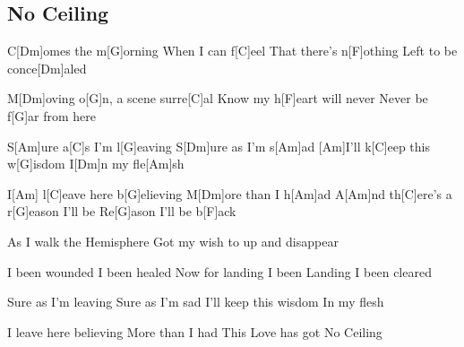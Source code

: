 \subsection*{No Ceiling}
\begin{guitar}
C[Dm]omes the m[G]orning
When I can f[C]eel
That there's n[F]othing
Left to be conce[Dm]aled

M[Dm]oving o[G]n,
a scene surre[C]al
Know my h[F]eart will never
Never be f[G]ar from here

S[Am]ure a[C]s I'm l[G]eaving
S[Dm]ure as I'm s[Am]ad
[Am]I'll k[C]eep this w[G]isdom
I[Dm]n my fle[Am]sh

I[Am]   l[C]eave here b[G]elieving
M[Dm]ore than I h[Am]ad
A[Am]nd th[C]ere's a r[G]eason I'll be
Re[G]ason I'll be b[F]ack


As I walk
the Hemisphere
Got my wish
to up and disappear

I been wounded
I been healed
Now for landing I been
Landing I been cleared

Sure as I'm leaving
Sure as I'm sad
I'll keep this wisdom
In my flesh

I leave here believing
More than I had
This Love has got
No Ceiling
\end{guitar}
